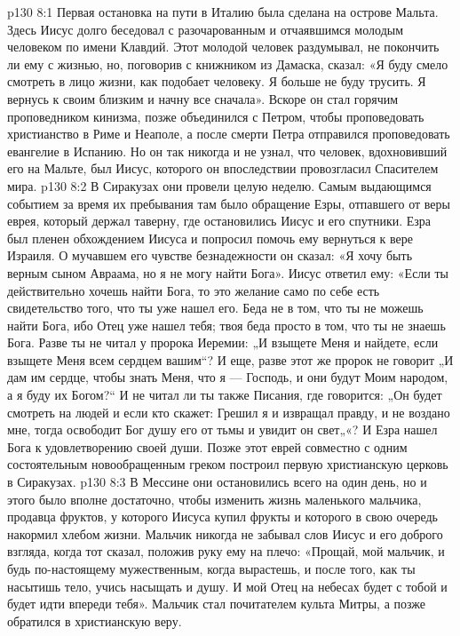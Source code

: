 \vs p130 8:1 Первая остановка на пути в Италию была сделана на острове Мальта. Здесь Иисус долго беседовал с разочарованным и отчаявшимся молодым человеком по имени Клавдий. Этот молодой человек раздумывал, не покончить ли ему с жизнью, но, поговорив с книжником из Дамаска, сказал: «Я буду смело смотреть в лицо жизни, как подобает человеку. Я больше не буду трусить. Я вернусь к своим близким и начну все сначала». Вскоре он стал горячим проповедником кинизма, позже объединился с Петром, чтобы проповедовать христианство в Риме и Неаполе, а после смерти Петра отправился проповедовать евангелие в Испанию. Но он так никогда и не узнал, что человек, вдохновивший его на Мальте, был Иисус, которого он впоследствии провозгласил Спасителем мира.
\vs p130 8:2 \pc В Сиракузах они провели целую неделю. Самым выдающимся событием за время их пребывания там было обращение Езры, отпавшего от веры еврея, который держал таверну, где остановились Иисус и его спутники. Езра был пленен обхождением Иисуса и попросил помочь ему вернуться к вере Израиля. О мучавшем его чувстве безнадежности он сказал: «Я хочу быть верным сыном Авраама, но я не могу найти Бога». Иисус ответил ему: «Если ты действительно хочешь найти Бога, то это желание само по себе есть свидетельство того, что ты уже нашел его. Беда не в том, что ты не можешь найти Бога, ибо Отец уже нашел тебя; твоя беда просто в том, что ты не знаешь Бога. Разве ты не читал у пророка Иеремии: „И взыщете Меня и найдете, если взыщете Меня всем сердцем вашим“? И еще, разве этот же пророк не говорит „И дам им сердце, чтобы знать Меня, что я --- Господь, и они будут Моим народом, а я буду их Богом?“ И не читал ли ты также Писания, где говорится: „Он будет смотреть на людей и если кто скажет: Грешил я и извращал правду, и не воздано мне, тогда освободит Бог душу его от тьмы и увидит он свет„«? И Езра нашел Бога к удовлетворению своей души. Позже этот еврей совместно с одним состоятельным новообращенным греком построил первую христианскую церковь в Сиракузах.
\vs p130 8:3 \pc В Мессине они остановились всего на один день, но и этого было вполне достаточно, чтобы изменить жизнь маленького мальчика, продавца фруктов, у которого Иисуса купил фрукты и которого в свою очередь накормил хлебом жизни. Мальчик никогда не забывал слов Иисус и его доброго взгляда, когда тот сказал, положив руку ему на плечо: «Прощай, мой мальчик, и будь по\hyp{}настоящему мужественным, когда вырастешь, и после того, как ты насытишь тело, учись насыщать и душу. И мой Отец на небесах будет с тобой и будет идти впереди тебя». Мальчик стал почитателем культа Митры, а позже обратился в христианскую веру.
